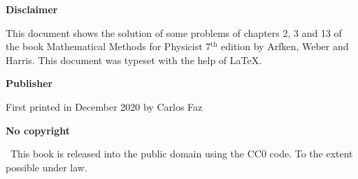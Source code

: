 


\textbf{Disclaimer}

This document shows the solution of some problems of chapters 2, 3 and 13 of the book Mathematical Methods for Physicist 7$^{\text{th}}$ edition by Arfken, Weber and Harris. This document was typeset with the help of \LaTeX.

\vspace{3mm}

\textbf{Publisher}

First printed in December 2020 by Carlos Faz

\vspace{3mm}

\textbf{No copyright}

\cczero\ This book is released into the public domain using the CC0 code. To the extent possible under law.



\restoregeometry